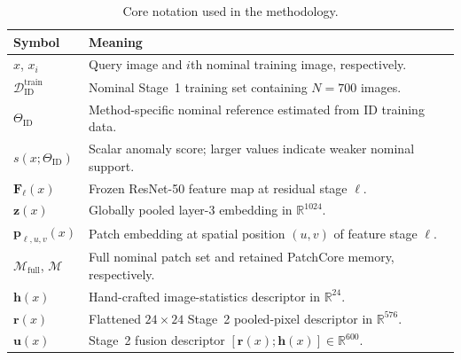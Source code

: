 \documentclass[fleqn,12pt]{olplainarticle}
\begin{document}
\begin{table}[htbp]
    \centering
    \caption[Core methodology notation.]{Core notation used in the methodology.}
    \label{tab:method_notation}

    \small
    \setlength{\tabcolsep}{6pt}
    \renewcommand{\arraystretch}{1.10}

    \begin{tabularx}{0.94\textwidth}{@{}
        >{\centering\arraybackslash}p{2.5cm}
        >{\raggedright\arraybackslash}X
    @{}}
        \toprule
        \textbf{Symbol} &
        \textbf{Meaning} \\
        \midrule

        $x$, $x_i$ &
        Query image and $i$th nominal training image, respectively. \\

        $\mathcal{D}_{\mathrm{ID}}^{\mathrm{train}}$ &
        Nominal Stage~1 training set containing $N=700$ images. \\

        $\Theta_{\mathrm{ID}}$ &
        Method-specific nominal reference estimated from ID training data. \\

        $s(x;\Theta_{\mathrm{ID}})$ &
        Scalar anomaly score; larger values indicate weaker nominal support. \\

        $\mathbf{F}_{\ell}(x)$ &
        Frozen ResNet-50 feature map at residual stage $\ell$. \\

        $\mathbf{z}(x)$ &
        Globally pooled layer-3 embedding in $\mathbb{R}^{1024}$. \\

        $\mathbf{p}_{\ell,u,v}(x)$ &
        Patch embedding at spatial position $(u,v)$ of feature stage $\ell$. \\

        $\mathcal{M}_{\mathrm{full}}$, $\mathcal{M}$ &
        Full nominal patch set and retained PatchCore memory, respectively. \\

        $\mathbf{h}(x)$ &
        Hand-crafted image-statistics descriptor in $\mathbb{R}^{24}$. \\

        $\mathbf{r}(x)$ &
        Flattened $24\times24$ Stage~2 pooled-pixel descriptor in
        $\mathbb{R}^{576}$. \\

        $\mathbf{u}(x)$ &
        Stage~2 fusion descriptor
        $[\mathbf{r}(x);\mathbf{h}(x)]\in\mathbb{R}^{600}$. \\

        \bottomrule
    \end{tabularx}
\end{table}
\end{document}
